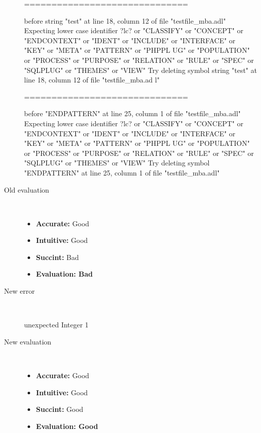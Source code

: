\begin{description}
\begin{haskell}
==============================

before string "test" at line 18, column 12 of file "testfile_mba.adl"
Expecting lower case identifier ?lc? or "CLASSIFY" or "CONCEPT" or "ENDCONTEXT"
or "IDENT" or "INCLUDE" or "INTERFACE" or "KEY" or "META" or "PATTERN" or "PHPPL
UG" or "POPULATION" or "PROCESS" or "PURPOSE" or "RELATION" or "RULE" or "SPEC"
or "SQLPLUG" or "THEMES" or "VIEW"
Try deleting symbol string "test" at line 18, column 12 of file "testfile_mba.ad
l"

==============================

before "ENDPATTERN" at line 25, column 1 of file "testfile_mba.adl"
Expecting lower case identifier ?lc? or "CLASSIFY" or "CONCEPT" or "ENDCONTEXT"
or "IDENT" or "INCLUDE" or "INTERFACE" or "KEY" or "META" or "PATTERN" or "PHPPL
UG" or "POPULATION" or "PROCESS" or "PURPOSE" or "RELATION" or "RULE" or "SPEC"
or "SQLPLUG" or "THEMES" or "VIEW"
Try deleting symbol "ENDPATTERN" at line 25, column 1 of file "testfile_mba.adl"
\end{haskell}
  \item[Old evaluation]~\\
    \begin{itemize}
    \item \textbf{Accurate:} Good
    \item \textbf{Intuitive:} Good
    \item \textbf{Succint:} Bad
    \item \textbf{Evaluation: Bad}
    \end{itemize}
  \item[New error]~\\
\begin{haskell}
unexpected Integer 1\end{haskell}
  \item[New evaluation]~\\
    \begin{itemize}
    \item \textbf{Accurate:} Good
    \item \textbf{Intuitive:} Good
    \item \textbf{Succint:} Good
    \item \textbf{Evaluation: Good
}
    \end{itemize}
  \end{description}

\hrulefill

